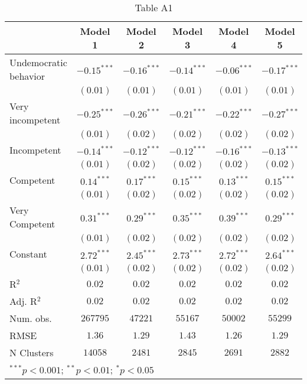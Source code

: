 
\begin{table}[!htbp]
\caption{Table A1}
\begin{center}
\begin{tabular}{l c c c c c}
\hline
 & Model 1 & Model 2 & Model 3 & Model 4 & Model 5 \\
\hline
Undemocratic behavior & $-0.15^{***}$ & $-0.16^{***}$ & $-0.14^{***}$ & $-0.06^{***}$ & $-0.17^{***}$ \\
                      & $(0.01)$      & $(0.01)$      & $(0.01)$      & $(0.01)$      & $(0.01)$      \\
Very incompetent      & $-0.25^{***}$ & $-0.26^{***}$ & $-0.21^{***}$ & $-0.22^{***}$ & $-0.27^{***}$ \\
                      & $(0.01)$      & $(0.02)$      & $(0.02)$      & $(0.02)$      & $(0.02)$      \\
Incompetent           & $-0.14^{***}$ & $-0.12^{***}$ & $-0.12^{***}$ & $-0.16^{***}$ & $-0.13^{***}$ \\
                      & $(0.01)$      & $(0.02)$      & $(0.02)$      & $(0.02)$      & $(0.02)$      \\
Competent             & $0.14^{***}$  & $0.17^{***}$  & $0.15^{***}$  & $0.13^{***}$  & $0.15^{***}$  \\
                      & $(0.01)$      & $(0.02)$      & $(0.02)$      & $(0.02)$      & $(0.02)$      \\
Very Competent        & $0.31^{***}$  & $0.29^{***}$  & $0.35^{***}$  & $0.39^{***}$  & $0.29^{***}$  \\
                      & $(0.01)$      & $(0.02)$      & $(0.02)$      & $(0.02)$      & $(0.02)$      \\
Constant              & $2.72^{***}$  & $2.45^{***}$  & $2.73^{***}$  & $2.72^{***}$  & $2.64^{***}$  \\
                      & $(0.01)$      & $(0.02)$      & $(0.02)$      & $(0.02)$      & $(0.02)$      \\
\hline
R$^2$                 & $0.02$        & $0.02$        & $0.02$        & $0.02$        & $0.02$        \\
Adj. R$^2$            & $0.02$        & $0.02$        & $0.02$        & $0.02$        & $0.02$        \\
Num. obs.             & $267795$      & $47221$       & $55167$       & $50002$       & $55299$       \\
RMSE                  & $1.36$        & $1.29$        & $1.43$        & $1.26$        & $1.29$        \\
N Clusters            & $14058$       & $2481$        & $2845$        & $2691$        & $2882$        \\
\hline
\multicolumn{6}{l}{\scriptsize{$^{***}p<0.001$; $^{**}p<0.01$; $^{*}p<0.05$}}
\end{tabular}
\label{table:coefficients}
\end{center}
\end{table}
